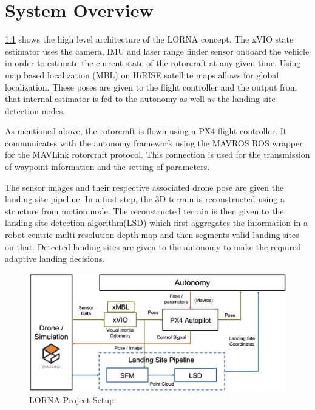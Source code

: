 \chapter{System Overview}

\cref{fig:lorna_setup} shows the high level architecture of the LORNA concept. 
The xVIO state estimator uses the camera, IMU and laser range finder sensor onboard the vehicle in order to estimate the current state of the rotorcraft at any given time. Using map based localization (MBL) on HiRISE satellite maps allows for global localization. These poses are given to the flight controller and the output from that internal estimator is fed to the autonomy as well as the landing site detection nodes.

As mentioned above, the rotorcraft is flown using a PX4 flight controller. It communicates with the autonomy framework using the MAVROS ROS wrapper for the MAVLink rotorcraft protocol. This connection is used for the transmission of waypoint information and the setting of parameters.

The sensor images and their respective associated drone pose are given the landing site pipeline. In a first step, the 3D terrain is reconstructed using a structure from motion node. The reconstructed terrain is then given to the landing site detection algorithm(LSD) which first aggregates the information in a robot-centric multi resolution depth map and then segments valid landing sites on that. Detected landing sites are given to the autonomy to make the required adaptive landing decisions.



\begin{figure}[ht]
    \centering
    \includegraphics[scale=0.18]{images/system_overview/setup_flowchart_with_vio.png}
    \caption{LORNA Project Setup}
    \label{fig:lorna_setup}
\end{figure}%

